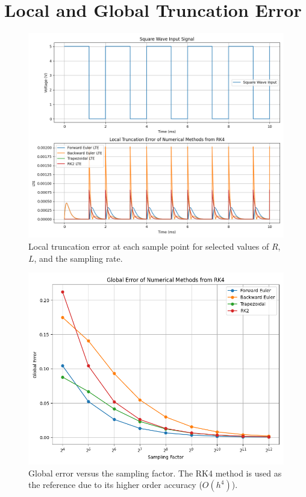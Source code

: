 \section{Local and Global Truncation Error}
\begin{figure}[H]
  \centering
  \includegraphics[width=\textwidth]{figs/local_error.png}
  \caption{Local truncation error at each sample point for selected values of $R$, $L$, and the sampling rate.}
  \label{fig:local_error}
\end{figure}

\begin{figure}[H]
  \centering
  \includegraphics[width=\textwidth]{figs/global_error.png}
  \caption{Global error versus the sampling factor. The RK4 method is used as the reference due to its higher order accuracy ($O(h^4)$).}
  \label{fig:global_error}
\end{figure}
